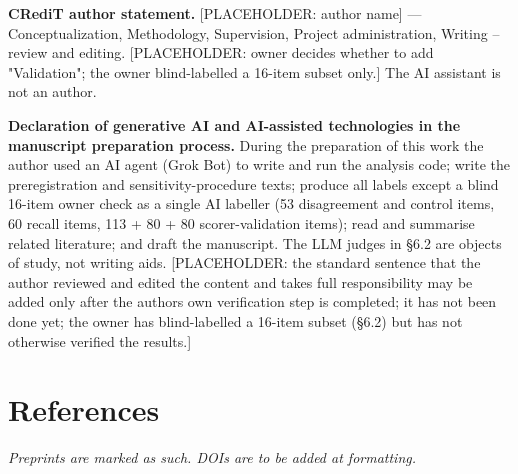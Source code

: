 \documentclass[11pt]{article}
\begin{document}
\textbf{CRediT author statement.} {[}PLACEHOLDER: author name{]} --- Conceptualization, Methodology, Supervision, Project administration, Writing -- review and editing. {[}PLACEHOLDER: owner decides whether to add "Validation"; the owner blind-labelled a 16-item subset only.{]} The AI assistant is not an author.

\textbf{Declaration of generative AI and AI-assisted technologies in the manuscript preparation process.} During the preparation of this work the author used an AI agent (Grok Bot) to write and run the analysis code; write the preregistration and sensitivity-procedure texts; produce all labels except a blind 16-item owner check as a single AI labeller (53 disagreement and control items, 60 recall items, 113 + 80 + 80 scorer-validation items); read and summarise related literature; and draft the manuscript. The LLM judges in §6.2 are objects of study, not writing aids. {[}PLACEHOLDER: the standard sentence that the author reviewed and edited the content and takes full responsibility may be added only after the author\textquotesingle s own verification step is completed; it has not been done yet; the owner has blind-labelled a 16-item subset (§6.2) but has not otherwise verified the results.{]}

\section{References}\label{references}

\emph{Preprints are marked as such. DOIs are to be added at formatting.}
\end{document}
